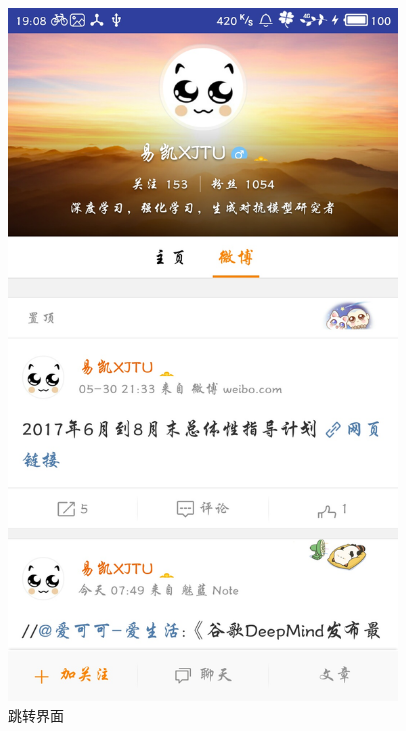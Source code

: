 \documentclass[UTF8, Microsoft YaHei]{book}
\begin{document}
\begin{figure}[!htb]
\begin{minipage}[c]{0.33\textwidth}
     \includegraphics[width=0.92\textwidth]{img/weibo.png}
    \end{minipage}
    \caption{跳转界面}
    \end{figure}
\end{document}
